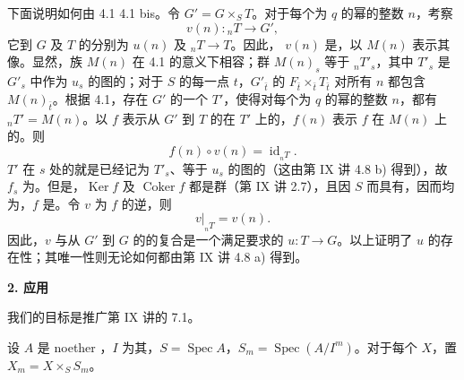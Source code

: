 下面说明如何由 4.1  4.1 bis。令 $G'=G\times_ST$。对于每个为 $q$ 的幂的整数 $n$，考察
\[v(n):{}_nT\longrightarrow G',\]
它到 $G$ 及 $T$ 的分别为 $u(n)$ 及 ${}_nT\to T$。因此， $v(n)$ 是，以 $M(n)$ 表示其像。显然，族 $M(n)$ 在 4.1 的意义下相容；群 $M(n)_s$ 等于 ${}_nT'_s$，其中 $T'_s$ 是 $G'_s$ 中作为 $u_s$ 的图的；对于 $S$ 的每一点 $t$，$G'_{\bar t}$ 的 $F_{\bar t}\times_{\bar t}T_{\bar t}$ 对所有 $n$ 都包含 $M(n)_{\bar t}$。根据 4.1，存在 $G'$ 的一个 $T'$，使得对每个为 $q$ 的幂的整数 $n$，都有 ${}_nT'=M(n)$。以 $f$ 表示从 $G'$ 到 $T$ 的在 $T'$ 上的，$f(n)$ 表示 $f$ 在 $M(n)$ 上的。则
\[f(n)\circ v(n)=\operatorname{id}_{{}_nT}.\]
$T'$ 在 $s$ 处的就是已经记为 $T'_s$、等于 $u_s$ 的图的（这由第 IX 讲 4.8 b) 得到），故 $f_s$ 为。但是，$\operatorname{Ker}f$ 及 $\operatorname{Coker}f$ 都是群（第 IX 讲 2.7），且因 $S$ 而具有，因而均为，$f$ 是。令 $v$ 为 $f$ 的逆，则
\[v|_{{}_nT}=v(n).\]
因此，$v$ 与从 $G'$ 到 $G$ 的的复合是一个满足要求的 $u:T\to G$。以上证明了 $u$ 的存在性；其唯一性则无论如何都由第 IX 讲 4.8 a) 得到。

\textbf{2. 应用}

我们的目标是推广第 IX 讲的 7.1。

设 $A$ 是 noether ，$I$ 为其，$S=\operatorname{Spec}A$，$S_m=\operatorname{Spec}(A/I^m)$。对于每个 $X$，置 $X_m=X\times_SS_m$。

